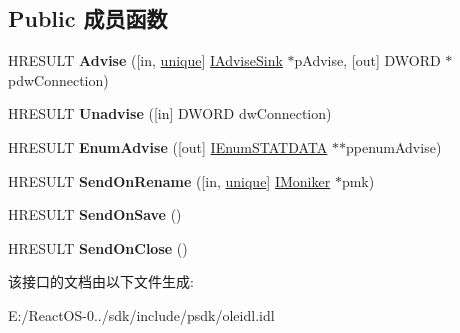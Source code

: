 \subsection*{Public 成员函数}
\begin{DoxyCompactItemize}
\item 
\mbox{\label{interface_i_ole_advise_holder_aa77a840b5af46d03853b4b261402ad24}} 
H\+R\+E\+S\+U\+LT {\bfseries Advise} (\mbox{[}in, \hyperlink{interfaceunique}{unique}\mbox{]} \hyperlink{interface_i_advise_sink}{I\+Advise\+Sink} $\ast$p\+Advise, \mbox{[}out\mbox{]} D\+W\+O\+RD $\ast$pdw\+Connection)
\item 
\mbox{\label{interface_i_ole_advise_holder_a3f0fbbeb0e87fee0cc7567b48677ccc6}} 
H\+R\+E\+S\+U\+LT {\bfseries Unadvise} (\mbox{[}in\mbox{]} D\+W\+O\+RD dw\+Connection)
\item 
\mbox{\label{interface_i_ole_advise_holder_a36f0700f929c6f12fc29ecfbe48c95de}} 
H\+R\+E\+S\+U\+LT {\bfseries Enum\+Advise} (\mbox{[}out\mbox{]} \hyperlink{interface_i_enum_s_t_a_t_d_a_t_a}{I\+Enum\+S\+T\+A\+T\+D\+A\+TA} $\ast$$\ast$ppenum\+Advise)
\item 
\mbox{\label{interface_i_ole_advise_holder_a3483cd2625fa52bf38ab66a2bdda96d8}} 
H\+R\+E\+S\+U\+LT {\bfseries Send\+On\+Rename} (\mbox{[}in, \hyperlink{interfaceunique}{unique}\mbox{]} \hyperlink{interface_i_moniker}{I\+Moniker} $\ast$pmk)
\item 
\mbox{\label{interface_i_ole_advise_holder_a09f78b96b7d1625b1de84a914bd85780}} 
H\+R\+E\+S\+U\+LT {\bfseries Send\+On\+Save} ()
\item 
\mbox{\label{interface_i_ole_advise_holder_a242e3fbd0d644be149fdfad2a45a642b}} 
H\+R\+E\+S\+U\+LT {\bfseries Send\+On\+Close} ()
\end{DoxyCompactItemize}


该接口的文档由以下文件生成\+:\begin{DoxyCompactItemize}
\item 
E\+:/\+React\+O\+S-\/0../sdk/include/psdk/oleidl.\+idl\end{DoxyCompactItemize}
